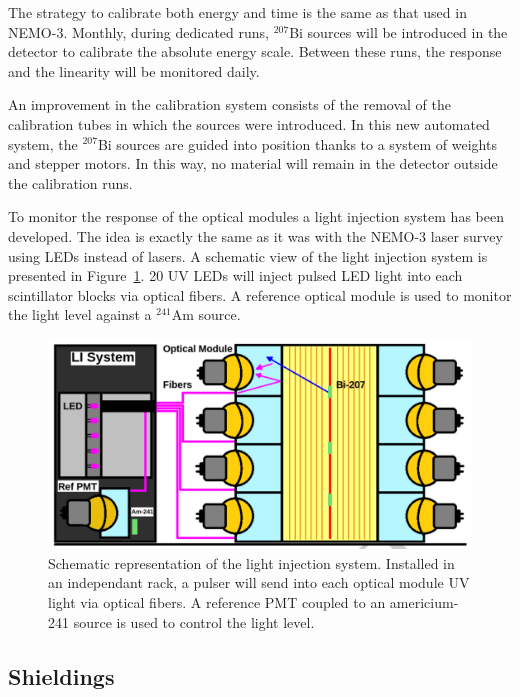 \documentclass[main.tex]{subfiles}
\begin{document}
\NI The strategy to calibrate both energy and time is the same as that used in NEMO-3. Monthly, during dedicated runs, $^{\text{207}}$Bi sources will be introduced in the detector to calibrate the absolute energy scale. Between these runs, the response and the linearity will be monitored daily. 


\bigskip


\NI An improvement in the calibration system consists of the removal of the calibration tubes in which the sources were introduced. In this new automated system, the $^{\text{207}}$Bi sources are guided into position thanks to a system of weights and stepper motors. In this way, no material will remain in the detector outside the calibration runs.


\bigskip


\NI To monitor the response of the optical modules a light injection system has been developed. The idea is exactly the same as it was with the NEMO-3 laser survey using LEDs instead of lasers. A schematic view of the light injection system is presented in Figure~\ref{LIschema}. 20 UV LEDs will inject pulsed LED light into each scintillator blocks via optical fibers. A reference optical module is used to monitor the light level against a $^{\text{241}}$Am source.


\bigskip
\begin{figure}[h!]
\begin{center}
\includegraphics[scale=0.3]{pictures/Chap3/LIschema.png}
\caption{Schematic representation of the light injection system. Installed in an independant rack, a pulser will send into each optical module UV light via optical fibers. A reference PMT coupled to an americium-241 source is used to control the light level.}
\label{LIschema}
\end{center}
\end{figure}


\subsection{Shieldings}
\end{document}

